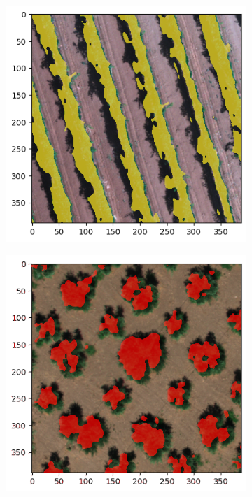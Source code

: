 \documentclass[comsoc,final]{IEEEtran}
\begin{document}
\begin{figure}
{\begin{subfigure}[b]{0.45\columnwidth}
         \centering \includegraphics[width=\columnwidth]{VITE0INF}
     \end{subfigure}}
%       
      \begin{subfigure}[b]{0.45\columnwidth}
         \centering \includegraphics[width=\columnwidth]{ULIVO1INF}

\end{subfigure}
\end{figure}
\end{document}
